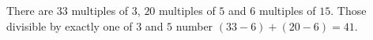 There are $33$ multiples of $3$, $20$ multiples of $5$ and $6$ multiples of $15$. Those divisible by exactly one of $3$ and $5$ number $(33-6)+(20-6)=\boxed{41}$.
